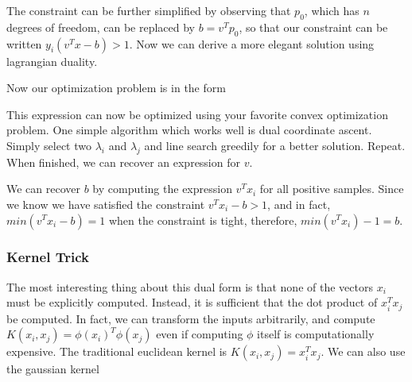\documentclass[12pt]{article}
\begin{document}
The constraint can be further simplified by observing that $p_0$, which has $n$ degrees of freedom, can be replaced by $b = v^Tp_0$, so that our constraint can be written $y_i (v^Tx - b) > 1$. Now we can derive a more elegant solution using lagrangian duality. 


Now our optimization problem is in the form

This expression can now be optimized using your favorite convex optimization problem. One simple algorithm which works well is dual coordinate ascent. Simply select two $\lambda_i$ and $\lambda_j$ and line search greedily for a better solution. Repeat. When finished, we can recover an expression for $v$.

We can recover $b$ by computing the expression $v^Tx_i$ for all positive samples. Since we know we have satisfied the constraint $v^Tx_i - b > 1$, and in fact, $min(v^Tx_i -b) = 1$ when the constraint is tight, therefore, $min(v^Tx_i)-1 = b$. 

\subsubsection{Kernel Trick}

The most interesting thing about this dual form is that none of the vectors $x_i$ must be explicitly computed. Instead, it is sufficient that the dot product of $x_i^T x_j$ be computed. In fact, we can transform the inputs arbitrarily, and compute $K(x_i, x_j) = \phi(x_i)^T \phi(x_j)$ even if computing $\phi$ itself is computationally expensive. The traditional euclidean kernel is $K(x_i, x_j) = x_i^Tx_j$. We can also use the gaussian kernel
\end{document}
